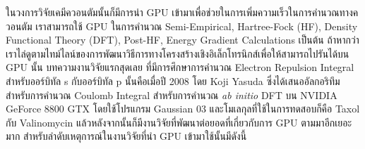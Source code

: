 ในวงการวิจัยเคมีควอนตัมนั้นก็มีการนำ GPU เข้ามาเพื่อช่วยในการเพิ่มความเร็วในการคำนวณทางควอนตัม เราสามารถใช้ GPU ในการคำนวณ
Semi-Empirical, Hartree-Fock (HF), Density Functional Theory (DFT), Post-HF, Energy Gradient Calculations เป็นต้น
ถ้าหากว่าเราไล่ดูตามไทม์ไลน์ของการพัฒนาวิธีการทางโครงสร้างเชิงอิเล็กโทรนิกส์เพื่อให้สามารถไปรันได้บน GPU นั้น บทความงานวิจัยแรกสุดเลย%
ที่มีการศึกษาการคำนวณ Electron Repulsion Integral สำหรับออร์บิทัล s กับออร์บิทัล p นั้นคือเมื่อปี 2008 โดย Koji Yasuda
ซึ่งได้เสนออัลกอริทึมสำหรับการคำนวณ Coulomb Integral สำหรับการคำนวณ \textit{ab initio} DFT บน NVIDIA GeForce 8800 GTX
โดยใช้โปรแกรม Gaussian 03 และโมเลกุลที่ใช้ในการทดสอบก็คือ Taxol กับ Valinomycin\autocite{yasuda2008}
แล้วหลังจากนั้นก็มีงานวิจัยที่พัฒนาต่อยอดที่เกี่ยวกับการ GPU ตามมาอีกเยอะมาก\autocite{qi2023} สำหรับลำดับเหตุการณ์ในงานวิจัยที่นำ GPU
เข้ามาใช้นั้นมีดังนี้


